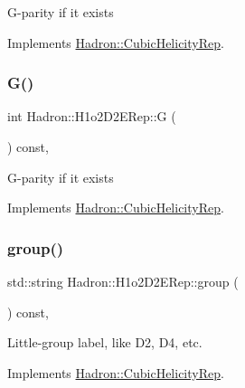 G-\/parity if it exists 

Implements \mbox{\hyperlink{structHadron_1_1CubicHelicityRep_a50689f42be1e6170aa8cf6ad0597018b}{Hadron\+::\+Cubic\+Helicity\+Rep}}.

\mbox{\label{structHadron_1_1H1o2D2ERep_a09f0fcd2252874b4875f2931d43349b6}} 
\subsubsection{\texorpdfstring{G()}{G()}\hspace{0.1cm}{\footnotesize\ttfamily [2/2]}}
{\footnotesize\ttfamily int Hadron\+::\+H1o2\+D2\+E\+Rep\+::G (\begin{DoxyParamCaption}{ }\end{DoxyParamCaption}) const\hspace{0.3cm}{\ttfamily [inline]}, {\ttfamily [virtual]}}

G-\/parity if it exists 

Implements \mbox{\hyperlink{structHadron_1_1CubicHelicityRep_a50689f42be1e6170aa8cf6ad0597018b}{Hadron\+::\+Cubic\+Helicity\+Rep}}.

\mbox{\label{structHadron_1_1H1o2D2ERep_a932070dfad7ef632122da818917b4fcc}} 
\subsubsection{\texorpdfstring{group()}{group()}\hspace{0.1cm}{\footnotesize\ttfamily [1/3]}}
{\footnotesize\ttfamily std\+::string Hadron\+::\+H1o2\+D2\+E\+Rep\+::group (\begin{DoxyParamCaption}{ }\end{DoxyParamCaption}) const\hspace{0.3cm}{\ttfamily [inline]}, {\ttfamily [virtual]}}

Little-\/group label, like D2, D4, etc. 

Implements \mbox{\hyperlink{structHadron_1_1CubicHelicityRep_a101a7d76cd8ccdad0f272db44b766113}{Hadron\+::\+Cubic\+Helicity\+Rep}}.

\mbox{\label{structHadron_1_1H1o2D2ERep_a932070dfad7ef632122da818917b4fcc}} 

